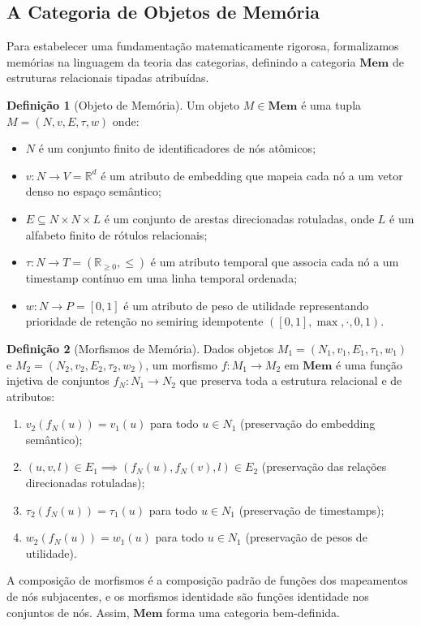 \documentclass[11pt,a4paper]{article}
\theoremstyle{definition}
\newtheorem{definicao}{Defini\c{c}\~ao}[section]
\begin{document}
\subsection{A Categoria de Objetos de Mem\'oria}

Para estabelecer uma fundamenta\c{c}\~ao matematicamente rigorosa, formalizamos mem\'orias na linguagem da teoria das categorias, definindo a categoria $\mathbf{Mem}$ de estruturas relacionais tipadas atribu\'idas.

\begin{definicao}[Objeto de Mem\'oria]
Um objeto $M \in \mathbf{Mem}$ \'e uma tupla $M = (N, v, E, \tau, w)$ onde:
\begin{itemize}
    \item $N$ \'e um conjunto finito de identificadores de n\'os at\^omicos;
    \item $v : N \to V = \mathbb{R}^d$ \'e um atributo de embedding que mapeia cada n\'o a um vetor denso no espa\c{c}o sem\^antico;
    \item $E \subseteq N \times N \times L$ \'e um conjunto de arestas direcionadas rotuladas, onde $L$ \'e um alfabeto finito de r\'otulos relacionais;
    \item $\tau : N \to T = (\mathbb{R}_{\geq 0}, \leq)$ \'e um atributo temporal que associa cada n\'o a um timestamp cont\'inuo em uma linha temporal ordenada;
    \item $w : N \to P = [0,1]$ \'e um atributo de peso de utilidade representando prioridade de reten\c{c}\~ao no semiring idempotente $([0,1], \max, \cdot, 0, 1)$.
\end{itemize}
\end{definicao}

\begin{definicao}[Morfismos de Mem\'oria]
Dados objetos $M_1 = (N_1, v_1, E_1, \tau_1, w_1)$ e $M_2 = (N_2, v_2, E_2, \tau_2, w_2)$, um morfismo $f : M_1 \to M_2$ em $\mathbf{Mem}$ \'e uma fun\c{c}\~ao injetiva de conjuntos $f_N : N_1 \to N_2$ que preserva toda a estrutura relacional e de atributos:
\begin{enumerate}
    \item $v_2(f_N(u)) = v_1(u)$ para todo $u \in N_1$ (preserva\c{c}\~ao do embedding sem\^antico);
    \item $(u, v, l) \in E_1 \implies (f_N(u), f_N(v), l) \in E_2$ (preserva\c{c}\~ao das rela\c{c}\~oes direcionadas rotuladas);
    \item $\tau_2(f_N(u)) = \tau_1(u)$ para todo $u \in N_1$ (preserva\c{c}\~ao de timestamps);
    \item $w_2(f_N(u)) = w_1(u)$ para todo $u \in N_1$ (preserva\c{c}\~ao de pesos de utilidade).
\end{enumerate}
A composi\c{c}\~ao de morfismos \'e a composi\c{c}\~ao padr\~ao de fun\c{c}\~oes dos mapeamentos de n\'os subjacentes, e os morfismos identidade s\~ao fun\c{c}\~oes identidade nos conjuntos de n\'os. Assim, $\mathbf{Mem}$ forma uma categoria bem-definida.
\end{definicao}
\end{document}
